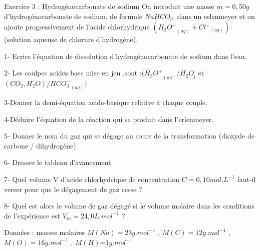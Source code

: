 \documentclass[12pt, french]{article}
\begin{document}

\begin{Box2}{Exercice 3 : Hydrogénocarbonate de sodium}
   On introduit une masse $m=0,50g$ d'hydrogénocarbonate de sodium, de formule $NaHCO_3$, dans un erlenmeyer et on ajoute progressivement de l'acide chlorhydrique $({H_3O^+}_{(aq)} + {Cl^-}_{(aq)})$ (solution aqueuse de chlorure d'hydrogène).

   1- Ecrire l’équation de dissolution d'hydrogénocarbonate de sodium dans l’eau.

   2- Les coulpes acides base mise en jeu ,sont :$({H_3O^+}_{(aq)}/{H_2O}_l $ et $(CO_2,H_2O)/{HCO_3^-}_{(aq)})$

   3-Donner la demi-équation acido-basique relative à chaque couple.

   4-Déduire l'équation de la réaction qui se produit dans l'erlenmeyer.

   5- Donner le nom du gaz qui se dégage au cours de la transformation (dioxyde de carbone /
dihydrogène)

   6- Dresser le tableau d’avancement

   7- Quel volume V d'acide chlorhydrique de concentration $C=0,10mol.L^{-1}$ faut-il verser pour que le
dégagement de gaz cesse ?

   8- Quel est alors le volume de gaz dégagé si le volume molaire dans les conditions de l'expérience est
   $V_m=24,0 L.mol^{-1}$ ?

   Données : masses molaires $M(Na) = 23 g.mol^{-1}$ , $M(C) = 12 g.mol^{-1}$ , $M(O) = 16 g.mol^{-1}$ , $M(H)$=$1 g.mol^{-1}$



\end{Box2}
\end{document}
